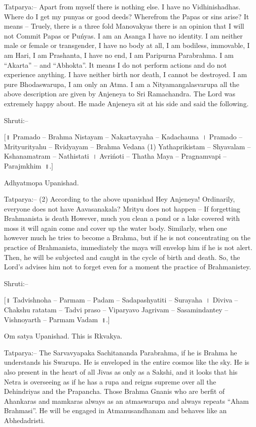 Tatparya:– Apart from myself there is nothing else. I have no Vidhinishadhas. Where do I get my punyas or good deeds? Wherefrom the Papas or sins arise? It means – Truely, there is a three fold Manovakyas there is an opinion that I will not Commit Papas or Puńyas. I am an Asanga I have no identity. I am neither male or female or transgender, I have no body at all, I am bodiless, immovable, I am Hari, I am Prashanta, I have no end, I am Paripurna Parabrahma. I am “Akarta” – and “Abhokta”. It means I do not perform actions and do not experience anything. I have neither birth nor death, I cannot be destroyed. I am pure Bhodaswarupa, I am only an Atma. I am a Nityamangalasvarupa all the above description are given by Anjeneya to Sri Ramachandra. The Lord was extremely happy about. He made Anjeneya sit at his side and said the following.

Shruti:–

[॥ Pramado – Brahma Nistayam – Nakartavyaha – Kadachauna~। Pramado – Mrityurityahu – Rvidyayam – Brahma Vedana (1) Yathaprikistam – Shyavalam – Kshanamatram – Nathistati~। Avrińoti – Thatha Maya – Pragnamvapi – Parajmkhim~॥.]

Adhyatmopa Upanishad.

Tatparya:– (2) According to the above upanishad Hey Anjeneya! Ordinarily, everyone does not have Aavasanakala? Mrityu does not happen – If forgetting Brahmanista is death However, much you clean a pond or a lake covered with moss it will again come and cover up the water body. Similarly, when one however much he tries to become a Brahma, but if he is not concentrating on the practice of Brahmanista, immediately the maya will envelop him if he is not alert. Then, he will be subjected and caught in the cycle of birth and death. So, the Lord's advises him not to forget even for a moment the practice of Brahmanistey.

Shruti:–

[॥ Tadvishnoha – Parmam – Padam – Sadapashyatiti – Surayaha~। Diviva – Chakshu ratatam – Tadvi praso – Viparyavo Jagrivam – Sasamindantey – Vishnoyarth – Parmam Vadam~॥.]

Om satya Upanishad. This is Rkvakya.

Tatparya:– The Sarvavyapaka Sachitananda Parabrahma, if he is Brahma he understands his Swarupa. He is enveloped in the entire cosmos like the sky. He is also present in the heart of all Jivas as only as a Sakshi, and it looks that his Netra is overseeing as if he has a rupa and reigns supreme over all the Dehindriyas and the Prapancha. Those Brahma Gnanis who are berfit of Ahankaras and mamkaras always as an atmaswarupa and always repeats “Aham Brahmasi”. He will be engaged in Atmanusandhanam and behaves like an Abhedadristi.

